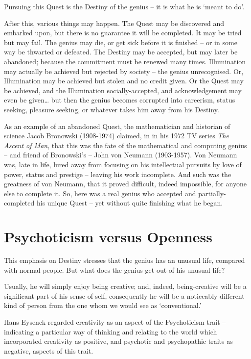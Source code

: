 \documentclass[
]{book}
\begin{document}
Pursuing this Quest is the Destiny of the genius -- it is what he is `meant to do'.

After this, various things may happen. The Quest may be discovered and embarked upon, but there is no guarantee it will be completed. It may be tried but may fail. The genius may die, or get sick before it is finished -- or in some way be thwarted or defeated. The Destiny may be accepted, but may later be abandoned; because the commitment must be renewed many times. Illumination may actually be achieved but rejected by society -- the genius unrecognised. Or, Illumination may be achieved but stolen and no credit given. Or the Quest may be achieved, and the Illumination socially-accepted, and acknowledgement may even be given\ldots{} but then the genius becomes corrupted into careerism, status seeking, pleasure seeking, or whatever takes him away from his Destiny.

As an example of an abandoned Quest, the mathematician and historian of science Jacob Bronowski (1908-1974) claimed, in in his 1972 TV series \emph{The Ascent of Man}, that this was the fate of the mathematical and computing genius -- and friend of Bronowski's -- John von Neumann (1903-1957). Von Neumann was, late in life, lured away from focusing on his intellectual pursuits by love of power, status and prestige -- leaving his work incomplete. And such was the greatness of von Neumann, that it proved difficult, indeed impossible, for anyone else to complete it. So, here was a real genius who accepted and partially-completed his unique Quest -- yet without quite finishing what he began.

\hypertarget{psychoticism-versus-openness}{%
\section{Psychoticism versus Openness}\label{psychoticism-versus-openness}}

This emphasis on Destiny stresses that the genius has an unusual life, compared with normal people. But what does the genius get out of his unusual life?

Usually, he will simply enjoy being creative; and, indeed, being-creative will be a significant part of his sense of self, consequently he will be a noticeably different kind of person from the one whom we would see as `conventional.'

Hans Eysenck regarded creativity as an aspect of the Psychoticism trait -- indicating a particular way of thinking and relating to the world which incorporated creativity as positive, and psychotic and psychopathic traits as negative, aspects of this trait.
\end{document}
